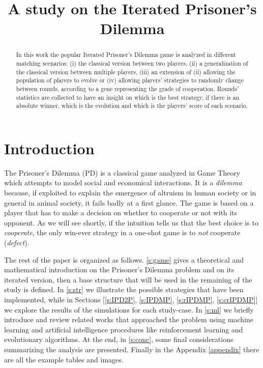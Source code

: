 \documentclass[journal,a4paper,10pt,twoside]{IEEEtran} %
\begin{document}
\title{A study on the Iterated Prisoner's Dilemma}

\author{%

}

\maketitle

\begin{abstract}
In this work the popular Iterated Prisoner's Dilemma game is analyzed in different matching scenarios: (i) the classical version between two players, (ii) a generalization of the classical version between multiple players, (iii) an extension of (ii) allowing the population of players to evolve or (iv) allowing players' strategies to randomly change between rounds, according to a gene representing the grade of cooperation. %
Rounds' statistics are collected to have an insight on which is the best strategy, if there is an absolute winner, which is the evolution and which is the players' score of each scenario.
\end{abstract}

\section{Introduction} \label{s:intro}
The Prisoner's Dilemma (PD) is a classical game analyzed in Game Theory which attempts to model social and economical interactions. It is a \textit{dilemma} because, if exploited to explain the emergence of altruism in human society or in general in animal society, it fails badly at a first glance. The game is based on a player that has to make a decision on whether to cooperate or not with its opponent. As we will see shortly, if the intuition tells us that the best choice is to \textit{cooperate}, the only win-ever strategy in a one-shot game is to \textit{not} cooperate (\textit{defect}).

The rest of the paper is organized as follows.
\autoref{s:game} gives a theoretical and mathematical introduction on the Prisoner's Dilemma problem and on its iterated version, then a base structure that will be used in the remaining of the study is defined.
In \autoref{s:str} we illustrate the possible strategies that have been implemented, while in Sections [\ref{s:IPD2P}, \ref{s:IPDMP}, \ref{s:rIPDMP}, \ref{s:crIPDMP}] we explore the results of the simulations for each study-case.
In \autoref{s:ml} we briefly introduce and review related works that approached the problem using machine learning and artificial intelligence procedures like reinforcement learning and evolutionary algorithms.
At the end, in \autoref{s:conc}, some final considerations summarizing the analysis are presented.
Finally in the Appendix \ref{appendix} there are all the example tables and images.
\end{document}
